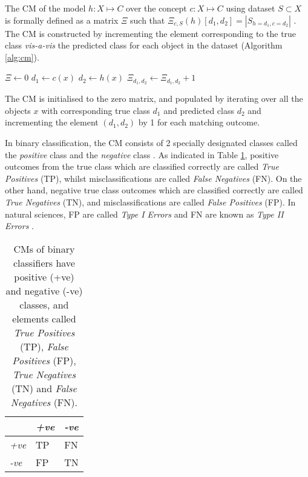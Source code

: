 The CM of the model $h : X \mapsto C$ over the concept $c : X \mapsto C$ using dataset $S \subset X$ is formally defined  as a matrix $\Xi$ such that $\Xi_{c,S}(h)[d_1,d_2] = |S_{h=d_1,c=d_2}|$ \citep{cichosz2014data}. The CM is constructed by incrementing the element corresponding to the true class \textit{vis-a-vis} the predicted class for each object in the dataset (Algorithm \ref{alg:cm}).

\begin{algorithm}
  \begin{algorithmic}
    \State $\Xi \gets 0$
      \State $d_1 \gets c(x)$
      \State $d_2 \gets h(x)$
      \State $\Xi_{d_1,d_2} \gets \Xi_{d_1,d_2} + 1$
    \EndFor
  \end{algorithmic}
  \caption{The CM is initialised to the zero matrix, and populated by iterating over all the objects $x$ with corresponding true class $d_1$ and predicted class $d_2$ and incrementing the element $(d_1,d_2)$ by 1 for each matching outcome.}
  \label{alg:cm}
\end{algorithm}

In binary classification, the CM consists of 2 specially designated classes called the \textit{positive} class and the \textit{negative} class \citep{saito2015precision}. As indicated in Table \ref{tab:cm_binary}, positive outcomes from the true class  which are classified correctly are called \textit{True Positives} (TP), whilst misclassifications are called \textit{False Negatives} (FN). On the other hand, negative true class outcomes which are classified correctly are called \textit{True Negatives} (TN), and misclassifications are called \textit{False Positives} (FP). In natural sciences, FP are called \textit{Type I Errors} and FN are known as \textit{Type II Errors} \citep{fielding1997review}.

\begin{table}[ht]
  \centering
  \selectfont
  \begin{tabular}{lll}
    \toprule
                  & \textit{+ve} & \textit{-ve} \\
    \midrule
    \textit{+ve}  & TP           & FN \\
    \textit{-ve}  & FP           & TN \\
    \bottomrule
  \end{tabular}
  \caption{CMs of binary classifiers have positive (+ve) and negative (-ve) classes, and elements called \textit{True Positives} (TP), \textit{False Positives} (FP), \textit{True Negatives} (TN) and \textit{False Negatives} (FN).}
  \label{tab:cm_binary}
\end{table}
\vspace{2mm}

